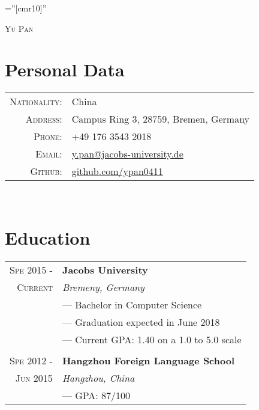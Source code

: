 \documentclass[a4paper,10pt]{article}
\begin{document}

\pagestyle{empty} %

\font\fb=''[cmr10]'' %

\par{\centering
		{\huge{\textsc{Yu Pan}}}\bigskip\par}

\section{Personal Data}
\begin{tabular}{rl}
    \textsc{Nationality:}&China \\
    \textsc{Address:}   & Campus Ring 3, 28759, Bremen, Germany\\
    \textsc{Phone:}     & +49 176 3543 2018\\
    \textsc{Email:}     & \href{mailto:y.pan@jacobs-university.de}{y.pan@jacobs-university.de} \\
    \textsc{Github:} &
    \href{https://github.com/ypan0411}{github.com/ypan0411}
\end{tabular}

~\\

\section{Education}
\begin{tabular}{r|l}	
\textsc{Spe 2015 - } & \textbf{Jacobs University} \\\textsc{Current}&\emph{Bremeny, Germany}
 \\& --- Bachelor in Computer Science
 \\& --- Graduation expected in June 2018
 \\& --- Current GPA: 1.40 on a 1.0 to 5.0 scale
 \\ \multicolumn{2}{c}{} \\
 \textsc{Spe 2012 - } & \textbf{Hangzhou Foreign Language School} \\\textsc{Jun 2015}&\emph{Hangzhou, China}
 \\& --- GPA: 87/100
\end{tabular}
\end{document}
